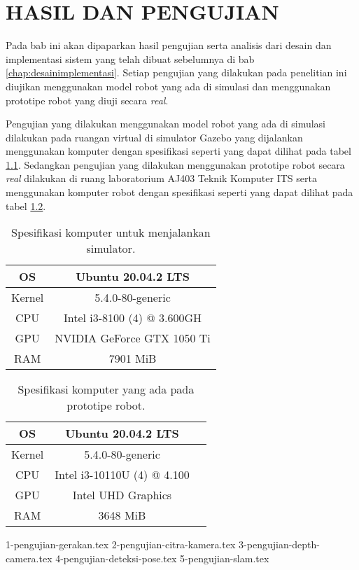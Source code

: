 \chapter{HASIL DAN PENGUJIAN}
\label{chap:hasilpengujian}

Pada bab ini akan dipaparkan hasil pengujian serta analisis dari desain dan implementasi sistem yang telah dibuat sebelumnya di bab \ref{chap:desainimplementasi}.
Setiap pengujian yang dilakukan pada penelitian ini diujikan menggunakan model robot yang ada di simulasi dan menggunakan prototipe robot yang diuji secara \emph{real}.

Pengujian yang dilakukan menggunakan model robot yang ada di simulasi dilakukan pada ruangan virtual di simulator Gazebo yang dijalankan menggunakan komputer dengan spesifikasi seperti yang dapat dilihat pada tabel \ref{tb:spesifikasikomputersimulator}.
Sedangkan pengujian yang dilakukan menggunakan prototipe robot secara \emph{real} dilakukan di ruang laboratorium AJ403 Teknik Komputer ITS serta menggunakan komputer robot dengan spesifikasi seperti yang dapat dilihat pada tabel \ref{tb:spesifikasikomputerrobot}.

\begin{longtable}{|c|c|}
  \caption{Spesifikasi komputer untuk menjalankan simulator.}
  \label{tb:spesifikasikomputersimulator}\\
  \hline
  OS      & Ubuntu 20.04.2 LTS \\
  \hline
  Kernel  & 5.4.0-80-generic \\
  \hline
  CPU     & Intel i3-8100 (4) @ 3.600GH \\
  \hline
  GPU     & NVIDIA GeForce GTX 1050 Ti \\
  \hline
  RAM     & 7901 MiB \\
  \hline
\end{longtable}

\begin{longtable}{|c|c|c|}
  \caption{Spesifikasi komputer yang ada pada prototipe robot.}
  \label{tb:spesifikasikomputerrobot}\\
  \hline
  OS      & Ubuntu 20.04.2 LTS \\
  \hline
  Kernel  & 5.4.0-80-generic \\
  \hline
  CPU     & Intel i3-10110U (4) @ 4.100 \\
  \hline
  GPU     & Intel UHD Graphics \\
  \hline
  RAM     & 3648 MiB \\
  \hline
\end{longtable}

{1-pengujian-gerakan.tex}
{2-pengujian-citra-kamera.tex}
{3-pengujian-depth-camera.tex}
{4-pengujian-deteksi-pose.tex}
{5-pengujian-slam.tex}
